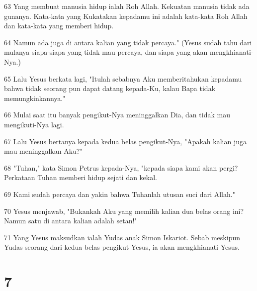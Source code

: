 \par 63 Yang membuat manusia hidup ialah Roh Allah. Kekuatan manusia tidak ada gunanya. Kata-kata yang Kukatakan kepadamu ini adalah kata-kata Roh Allah dan kata-kata yang memberi hidup.
\par 64 Namun ada juga di antara kalian yang tidak percaya." (Yesus sudah tahu dari mulanya siapa-siapa yang tidak mau percaya, dan siapa yang akan mengkhianati-Nya.)
\par 65 Lalu Yesus berkata lagi, "Itulah sebabnya Aku memberitahukan kepadamu bahwa tidak seorang pun dapat datang kepada-Ku, kalau Bapa tidak memungkinkannya."
\par 66 Mulai saat itu banyak pengikut-Nya meninggalkan Dia, dan tidak mau mengikuti-Nya lagi.
\par 67 Lalu Yesus bertanya kepada kedua belas pengikut-Nya, "Apakah kalian juga mau meninggalkan Aku?"
\par 68 "Tuhan," kata Simon Petrus kepada-Nya, "kepada siapa kami akan pergi? Perkataan Tuhan memberi hidup sejati dan kekal.
\par 69 Kami sudah percaya dan yakin bahwa Tuhanlah utusan suci dari Allah."
\par 70 Yesus menjawab, "Bukankah Aku yang memilih kalian dua belas orang ini? Namun satu di antara kalian adalah setan!"
\par 71 Yang Yesus maksudkan ialah Yudas anak Simon Iskariot. Sebab meskipun Yudas seorang dari kedua belas pengikut Yesus, ia akan mengkhianati Yesus.

\chapter{7}

